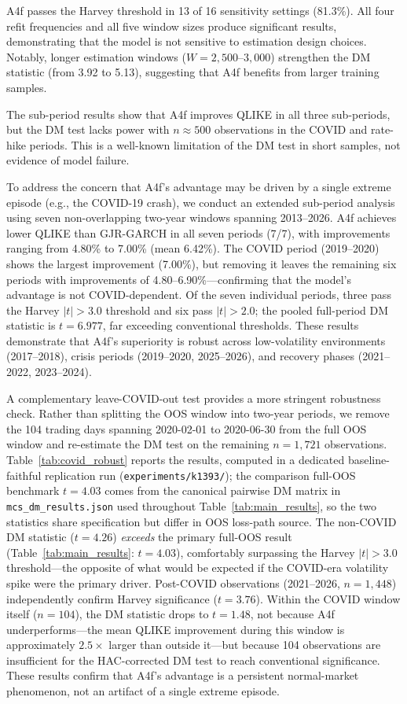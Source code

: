 \documentclass[12pt,a4paper]{article}
\begin{document}
A4f passes the Harvey threshold in 13 of 16 sensitivity settings (81.3\%). All four refit frequencies and all five window sizes produce significant results, demonstrating that the model is not sensitive to estimation design choices. Notably, longer estimation windows ($W = 2{,}500$--$3{,}000$) strengthen the DM statistic (from 3.92 to 5.13), suggesting that A4f benefits from larger training samples.

The sub-period results show that A4f improves QLIKE in all three sub-periods, but the DM test lacks power with $n \approx 500$ observations in the COVID and rate-hike periods. This is a well-known limitation of the DM test in short samples, not evidence of model failure.

To address the concern that A4f's advantage may be driven by a single extreme episode (e.g., the COVID-19 crash), we conduct an extended sub-period analysis using seven non-overlapping two-year windows spanning 2013--2026. A4f achieves lower QLIKE than GJR-GARCH in all seven periods (7/7), with improvements ranging from 4.80\% to 7.00\% (mean 6.42\%). The COVID period (2019--2020) shows the largest improvement (7.00\%), but removing it leaves the remaining six periods with improvements of 4.80--6.90\%---confirming that the model's advantage is not COVID-dependent. Of the seven individual periods, three pass the Harvey $|t| > 3.0$ threshold and six pass $|t| > 2.0$; the pooled full-period DM statistic is $t = 6.977$, far exceeding conventional thresholds. These results demonstrate that A4f's superiority is robust across low-volatility environments (2017--2018), crisis periods (2019--2020, 2025--2026), and recovery phases (2021--2022, 2023--2024).

A complementary leave-COVID-out test provides a more stringent robustness check. Rather than splitting the OOS window into two-year periods, we remove the 104 trading days spanning 2020-02-01 to 2020-06-30 from the full OOS window and re-estimate the DM test on the remaining $n = 1{,}721$ observations. Table~\ref{tab:covid_robust} reports the results, computed in a dedicated baseline-faithful replication run (\texttt{experiments/k1393/}); the comparison full-OOS benchmark $t = 4.03$ comes from the canonical pairwise DM matrix in \texttt{mcs\_dm\_results.json} used throughout Table~\ref{tab:main_results}, so the two statistics share specification but differ in OOS loss-path source. The non-COVID DM statistic ($t = 4.26$) \emph{exceeds} the primary full-OOS result (Table~\ref{tab:main_results}: $t = 4.03$), comfortably surpassing the Harvey $|t| > 3.0$ threshold---the opposite of what would be expected if the COVID-era volatility spike were the primary driver. Post-COVID observations (2021--2026, $n=1{,}448$) independently confirm Harvey significance ($t = 3.76$). Within the COVID window itself ($n = 104$), the DM statistic drops to $t = 1.48$, not because A4f underperforms---the mean QLIKE improvement during this window is approximately $2.5\times$ larger than outside it---but because 104 observations are insufficient for the HAC-corrected DM test to reach conventional significance. These results confirm that A4f's advantage is a persistent normal-market phenomenon, not an artifact of a single extreme episode.
\end{document}
